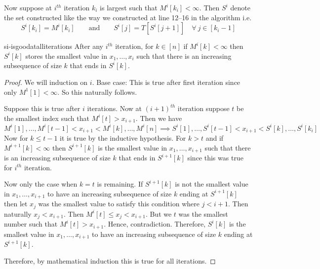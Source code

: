 Now suppose at $i^{th}$ iteration $k_i$ is largest such that $M^i[k_i]<\infty$. Then $S^i$ denote the set constructed like the way we constructed at line 12--16 in the algorithm i.e. $$S^i[k_i]=M^i[k_i]\qquad \text{and}\qquad S^i[j]=T[S^i[j+1]]\quad \forall\ j\in[k_i-1]$$
\begin{lemma}{}{si-isgoodatalliterations}
	After any $i^{th}$ iteration, for $k\in[n]$ if $M^i[k]<\infty$ then $S^i[k]$ stores the smallest value in $x_1,\dots, x_i$ such that there is an increasing subsequence of size $k$ that ends in $S^i[k]$.
\end{lemma}
\begin{proof}
We will induction on $i$. Base case: This is true after first iteration since only $M^1[1]<\infty$. So this naturally follows. 

Suppose this is true after $i$ iterations.  Now at $(i+1)^{th}$ iteration suppose $t$ be the smallest index such that $M^i[t]>x_{i+1}$. Then we have $$M^i[1],\dots, M^i[t-1]<x_{i+1}<M^i[k],\dots, M^i[n]\implies S^i[1],\dots, S^i[t-1]<x_{i+1}<S^i[k],\dots, S^i[k_i]$$ Now for $k\leq t-1$ it is true by the inductive hypothesis. For $k>t$ and if $M^{i+1}[k]<\infty$ then $S^{i+1}[k]$ is the smallest value in $x_1,\dots, x_{i+1}$ such that there is an increasing subsequence of size $k$ that ends in $S^{i+1}[k]$ since this was true for $i^{th}$ iteration. 

Now only the case when $k=t$ is remaining. If $S^{i+1}[k]$ is not the smallest value in $x_1,\dots ,x_{i+1}$ to have an increasing subsequence of size $k$ ending at $S^{i+1}[k]$ then let $x_j$ was the smallest value to satisfy this condition where $j<i+1$. Then naturally $x_j<x_{i+1}$. Then $M^{i}[t]\leq x_j<x_{i+1}$. But we $t$ was the smallest number such that $M^{i}[t]>x_{i+1}$. Hence, contradiction. Therefore, $S^i[k]$ is the smallest value in $x_1,\dots, x_{i+1}$ to have an increasing subsequence of size $k$ ending at $S^{i+1}[k]$. 

Therefore, by mathematical induction this is true for all iterations. 
\end{proof}




